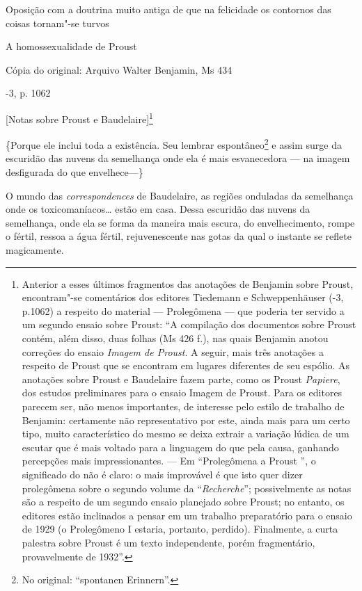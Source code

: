 Oposição com a doutrina muito antiga de que na felicidade os contornos
das coisas tornam"-se turvos

A homossexualidade de Proust

Cópia do original: Arquivo Walter Benjamin, Ms 434

-3, p. 1062

{[}Notas sobre Proust e Baudelaire{]}\footnote{Anterior a esses
  últimos fragmentos das anotações de Benjamin sobre Proust,
  encontram"-se comentários dos editores Tiedemann e Schweppenhäuser
  (-3, p.1062) a respeito do material --- Prolegômena ---
  que poderia ter servido a um segundo ensaio sobre Proust: ``A
  compilação dos documentos sobre Proust contém, além disso, duas folhas
  (Ms 426 f.), nas quais Benjamin anotou correções do ensaio
  \emph{Imagem de Proust}. A seguir, mais três anotações a respeito de
  Proust que se encontram em lugares diferentes de seu espólio. As
  anotações sobre Proust e Baudelaire fazem parte, como os Proust
  \emph{Papiere}, dos estudos preliminares para o ensaio Imagem de
  Proust. Para os editores parecem ser, não menos importantes, de
  interesse pelo estilo de trabalho de Benjamin: certamente não
  representativo por este, ainda mais para um certo tipo, muito
  característico do mesmo se deixa extrair a variação lúdica de um
  escutar que é mais voltado para a linguagem do que pela causa,
  ganhando percepções mais impressionantes. --- Em ``Prolegômena a Proust
  '', o significado do  não é claro: o mais improvável é que isto
  quer dizer prolegômena sobre o segundo volume da ``\emph{Recherche}'';
  possivelmente as notas são a respeito de um segundo ensaio planejado
  sobre Proust; no entanto, os editores estão inclinados a pensar em um
  trabalho preparatório para o ensaio de 1929 (o Prolegômeno I estaria,
  portanto, perdido). Finalmente, a curta palestra sobre Proust é um
  texto independente, porém fragmentário, provavelmente de 1932''. \versal{[N. E.]}}

\{Porque ele inclui toda a existência. Seu lembrar espontâneo\footnote{No original: ``spontanen Erinnern''. \versal{[N. T.]}} e assim surge da escuridão das
nuvens da semelhança onde ela é mais esvanecedora --- na imagem
desfigurada do que envelhece---\}

O mundo das \emph{correspondences} de Baudelaire, as regiões onduladas
da semelhança onde os toxicomaníacos\ldots{} estão em casa. Dessa escuridão
das nuvens da semelhança, onde ela se forma da maneira mais escura, do
envelhecimento, rompe o fértil, ressoa a água fértil, rejuvenescente nas
gotas da qual o instante se reflete magicamente.

